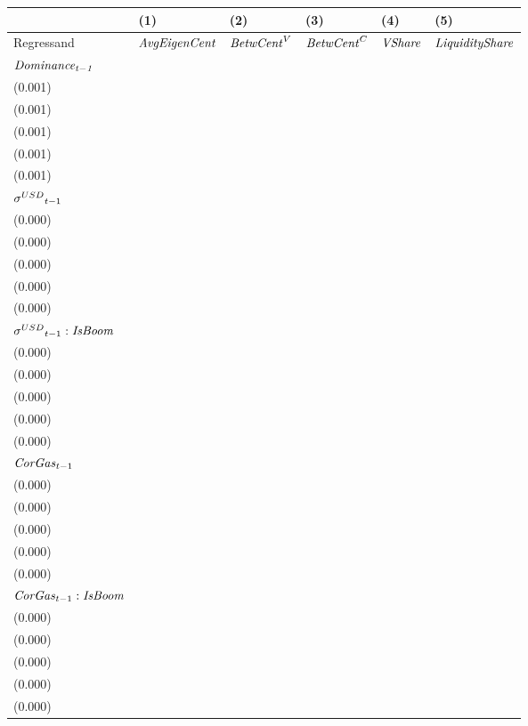 \begin{tabular}{llllll}
\toprule
{} &                                   (1) &                                   (2) &                                   (3) &                                   (4) &                                   (5) \\
\midrule
Regressand                                  &                  ${\it AvgEigenCent}$ &                    ${\it BetwCent}^V$ &                    ${\it BetwCent}^C$ &                        ${\it VShare}$ &                ${\it LiquidityShare}$ \\
$\it Dominance_{t-1}$                       &   \makecell{$0.844^{***}$ \\ (0.001)} &   \makecell{$0.950^{***}$ \\ (0.001)} &   \makecell{$0.951^{***}$ \\ (0.001)} &   \makecell{$0.887^{***}$ \\ (0.001)} &   \makecell{$0.925^{***}$ \\ (0.001)} \\
${{\it \sigma}^{USD}}_{t-1}$                &     \makecell{$-0.000^{}$ \\ (0.000)} &     \makecell{$-0.000^{}$ \\ (0.000)} &     \makecell{$-0.000^{}$ \\ (0.000)} &     \makecell{$-0.000^{}$ \\ (0.000)} &     \makecell{$-0.000^{}$ \\ (0.000)} \\
${{\it \sigma}^{USD}}_{t-1} : {\it IsBoom}$ &     \makecell{$0.000^{*}$ \\ (0.000)} &      \makecell{$0.000^{}$ \\ (0.000)} &      \makecell{$0.000^{}$ \\ (0.000)} &      \makecell{$0.000^{}$ \\ (0.000)} &      \makecell{$0.000^{}$ \\ (0.000)} \\
${{\it CorGas}}_{t-1}$                      &     \makecell{$-0.000^{}$ \\ (0.000)} &      \makecell{$0.000^{}$ \\ (0.000)} &      \makecell{$0.000^{}$ \\ (0.000)} &      \makecell{$0.000^{}$ \\ (0.000)} &     \makecell{$-0.000^{}$ \\ (0.000)} \\
${{\it CorGas}}_{t-1} : {\it IsBoom}$       &     \makecell{$-0.000^{}$ \\ (0.000)} &     \makecell{$-0.000^{}$ \\ (0.000)} &     \makecell{$-0.000^{}$ \\ (0.000)} &     \makecell{$-0.000^{}$ \\ (0.000)} &     \makecell{$-0.000^{}$ \\ (0.000)} \\

\end{tabular}
